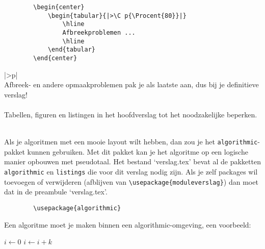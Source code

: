 \begin{Aanpassen}
	\begin{verbatim}
		\begin{center}
			\begin{tabular}{|>\C p{\Procent{80}}|}
				\hline
				Afbreekproblemen ...
				\hline
			\end{tabular}
		\end{center}
	\end{verbatim}
\end{Aanpassen}

\begin{center}
	\begin{tabular}{|>\C p{}|}
		\hline
		~\\
		Afbreek- en andere opmaakproblemen pak je als laatste aan,
		dus bij je definitieve verslag!\\
		~\\
		Tabellen, figuren en listingen in het hoofdverslag tot het
		noodzakelijke beperken.\\
		~\\
		\hline
	\end{tabular}
\end{center}



Als je algoritmen met een mooie layout wilt hebben, dan zou je het
\verb!algorithmic!-pakket kunnen gebruiken. Met dit pakket kan je het
algoritme op een logische manier opbouwen met pseudotaal. Het bestand
`verslag.tex' bevat al de pakketten \verb!algorithmic! en
\verb!listings! die voor dit verslag nodig zijn. Als je zelf packages
wil toevoegen of verwijderen (afblijven van
\verb!\usepackage{moduleverslag}!)  dan moet dat in de preambule
`verslag.tex'.

\begin{Aanpassen}
	\begin{verbatim}
		\usepackage{algorithmic}
	\end{verbatim}
\end{Aanpassen}

Een algoritme moet je maken binnen een algorithmic-omgeving, een
voorbeeld:

\begin{Aanpassen}[\small]
	\begin{algorithmic}
		\STATE $i\gets 0$
		\ELSE
		\STATE $i\gets i+k$
		\ENDIF
		\ENDIF 
	\end{algorithmic}
\end{Aanpassen}


